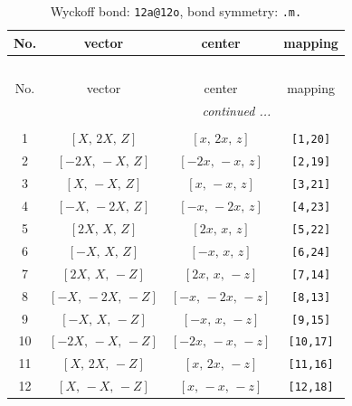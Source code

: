 \documentclass[fleqn,8pt]{jsarticle}
\begin{document}
\begin{longtable}{cccc}
\caption{Wyckoff bond: {\tt 12a@12o}, bond symmetry: {\tt .m.}}
 \\
 \hline \hline
No. & vector & center & mapping \\ \hline \endfirsthead

\multicolumn{3}{l}{\tablename\ \thetable{}} \\
 \hline \hline
No. & vector & center & mapping \\ \hline \endhead

 \hline \hline
\multicolumn{3}{r}{\footnotesize\it continued ...} \\ \endfoot

 \hline \hline
\multicolumn{3}{r}{} \\ \endlastfoot

1 & $\left[ X,\, 2 X,\, Z \right]$ & $\left[ x,\, 2 x,\, z \right]$ & {\tt [1,20]} \\ \hline
2 & $\left[ - 2 X,\, - X,\, Z \right]$ & $\left[ - 2 x,\, - x,\, z \right]$ & {\tt [2,19]} \\ \hline
3 & $\left[ X,\, - X,\, Z \right]$ & $\left[ x,\, - x,\, z \right]$ & {\tt [3,21]} \\ \hline
4 & $\left[ - X,\, - 2 X,\, Z \right]$ & $\left[ - x,\, - 2 x,\, z \right]$ & {\tt [4,23]} \\ \hline
5 & $\left[ 2 X,\, X,\, Z \right]$ & $\left[ 2 x,\, x,\, z \right]$ & {\tt [5,22]} \\ \hline
6 & $\left[ - X,\, X,\, Z \right]$ & $\left[ - x,\, x,\, z \right]$ & {\tt [6,24]} \\ \hline
7 & $\left[ 2 X,\, X,\, - Z \right]$ & $\left[ 2 x,\, x,\, - z \right]$ & {\tt [7,14]} \\ \hline
8 & $\left[ - X,\, - 2 X,\, - Z \right]$ & $\left[ - x,\, - 2 x,\, - z \right]$ & {\tt [8,13]} \\ \hline
9 & $\left[ - X,\, X,\, - Z \right]$ & $\left[ - x,\, x,\, - z \right]$ & {\tt [9,15]} \\ \hline
10 & $\left[ - 2 X,\, - X,\, - Z \right]$ & $\left[ - 2 x,\, - x,\, - z \right]$ & {\tt [10,17]} \\ \hline
11 & $\left[ X,\, 2 X,\, - Z \right]$ & $\left[ x,\, 2 x,\, - z \right]$ & {\tt [11,16]} \\ \hline
12 & $\left[ X,\, - X,\, - Z \right]$ & $\left[ x,\, - x,\, - z \right]$ & {\tt [12,18]} \\
\end{longtable}
\renewcommand{\arraystretch}{1.2}
\end{document}
